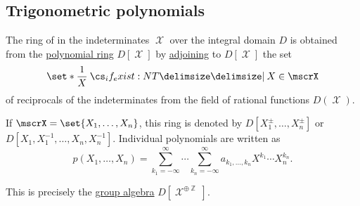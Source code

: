 \subsection{Trigonometric polynomials}\label{subsec:trigonometric_polynomials}

\begin{definition}\label{def:ring_of_laurent_polynomials}
  The ring of  in the indeterminates \( \mscrX \) over the integral domain \( D \) is obtained from the \hyperref[def:polynomial_algebra]{polynomial ring} \( D[\mscrX] \) by \hyperref[thm:adjoining_elements_to_field]{adjoining} to \( D[\mscrX] \) the set
  \begin{equation*}
    \set*{ \frac 1 X \given* X \in \mscrX }
  \end{equation*}
  of reciprocals of the indeterminates from the field of rational functions \( D(\mscrX) \).

  If \( \mscrX = \set{ X_1, \ldots, X_n } \), this ring is denoted by \( D[X_1^\pm, \ldots, X_n^\pm] \) or \( D[X_1, X_1^{-1}, \ldots, X_n, X_n^{-1}] \). Individual polynomials are written as
  \begin{equation*}
    p(X_1, \ldots, X_n) = \sum_{k_1=-\infty}^\infty \cdots \sum_{k_n=-\infty}^\infty a_{k_1, \ldots, k_n} X^{k_1} \cdots X_n^{k_n}.
  \end{equation*}
\end{definition}
\begin{comments}
  \item This is precisely the \hyperref[def:semigroup_algebra]{group algebra} \( D[\mscrX^{\oplus \BbbZ}] \).
\end{comments}

